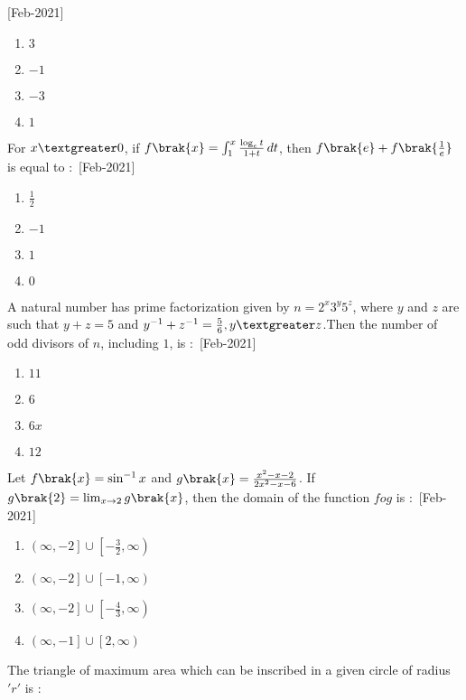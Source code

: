         \hfill{[Feb-2021]}
        \begin{enumerate}
            \item $3$
            \item $-1$
            \item $-3$
            \item $1$
        \end{enumerate}
    \item For $x\textgreater 0$, if $f\brak{x}=\int_{1}^{x}\frac{\log_{e}t}{1+t} \,dt$, then $f\brak{e}+f\brak{\frac{1}{e}}$ is equal to $\colon$
    \hfill{[Feb-2021]}
        \begin{enumerate}
            \item $\frac{1}{2}$
            \item $-1$
            \item $1$
            \item $0$
        \end{enumerate}
    \item A natural number has prime factorization given by $n=2^x3^y5^z$, where $y$ and $z$ are such that $y+z=5$ and $y^{-1}+z^{-1}=\frac{5}{6},y\textgreater z$.Then the number of odd divisors of $n$, including $1$, is $\colon$
    \hfill{[Feb-2021]}
        \begin{enumerate}
            \item $11$
            \item $6$
            \item $6x$
            \item $12$
        \end{enumerate}
    \item Let $f\brak{x}=\sin^{-1}{x}$ and $g\brak{x}=\frac{x^2-x-2}{2x^2-x-6}$. If $g\brak{2}=\lim_{x \to 2}g\brak{x}$, then the domain of the function $fog$ is $\colon$
    \hfill{[Feb-2021]}
        \begin{enumerate}
            \item $\left(\infty,-2 \right]\cup \left[-\frac{3}{2},\infty \right)$
            \item $\left(\infty,-2 \right]\cup \left[-1,\infty \right)$
            \item $\left(\infty,-2 \right]\cup \left[-\frac{4}{3},\infty \right)$
            \item $\left(\infty,-1 \right] \cup \left[2,\infty \right)$
        \end{enumerate}
    \item The triangle of maximum area which can be inscribed in a given circle of radius $'r'$ is $\colon$

